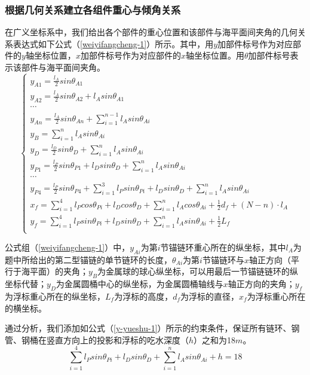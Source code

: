 \documentclass[withoutpreface,bwprint]{cumcmthesis} %
\begin{document}
\subsubsection*{根据几何关系建立各组件重心与倾角关系}
\par 在广义坐标系中，我们给出各个部件的重心位置和该部件与海平面间夹角的几何关系表达式如下公式（\ref{weiyifangcheng-1}）所示。其中，用$y$加部件标号作为对应部件的$y$轴坐标位置，$x$加部件标号作为对应部件的$x$轴坐标位置。用$\theta$加部件标号表示该部件与海平面间夹角。
\begin{equation}
	\label{weiyifangcheng-1}
	\left\{
	\begin{array}{lr}
		y_{A1} = \frac{l_A}{2} sin \theta_{A1}\\
		y_{A2} = \frac{l_A}{2} sin \theta_{A2} + l_A sin \theta_{A1}\\
		\cdots \\
		y_{An} = \frac{l_A}{2} sin \theta_{An} + \sum\limits_{i=1}^{n-1} l_A sin \theta_{Ai}\\
		y_B = \sum\limits_{i=1}^{n} l_A sin \theta_{Ai}\\
		y_D = \frac{l_D}{2} sin \theta_D + \sum\limits_{i=1}^{n} l_A sin \theta_{Ai}\\
		y_{P1} = \frac{l_P}{2} sin \theta_{P1} + l_D sin \theta_D + \sum\limits_{i=1}^{n} l_A sin \theta_{Ai}\\
		\cdots \\
		y_{P4} = \frac{l_P}{2} sin \theta_{P4} + \sum\limits_{i=1}^{3} l_P sin \theta_{Pi} + l_D sin \theta_D + \sum\limits_{i=1}^{n} l_A sin \theta_{Ai}\\
		x_f = \sum\limits_{i=1}^{4} l_P cos \theta_{Pi} + l_D cos \theta_D + \sum\limits_{i=1}^{n} l_A cos \theta_{Ai} + \frac{1}{2} d_f + (N - n) \cdot l_A\\
		y_f = \sum\limits_{i=1}^{4} l_P sin \theta_{Pi} + l_D sin \theta_D + \sum\limits_{i=1}^{n} l_A sin \theta_{Ai} + \frac{1}{2} L_f\\
	\end{array}
	\right.
\end{equation}

\par 公式组（\ref{weiyifangcheng-1}）中，$y_{Ai}$为第$i$节锚链环重心所在的纵坐标，其中$l_A$为题中所给出的第二型锚链的单节链环的长度，$\theta_{Ai}$为第$i$节锚链环与$x$轴正方向（平行于海平面）的夹角；$y_B$为金属球的球心纵坐标，可以用最后一节锚链链环的纵坐标代替；$y_D$为金属圆桶中心的纵坐标，为金属圆桶轴线与$x$轴正方向的夹角；$y_f$为浮标重心所在的纵坐标，$L_f$为浮标的高度，$d_f$为浮标的直径，$x_f$为浮标重心所在的横坐标。
\par 通过分析，我们添加如公式（\ref{y-yueshu-1}）所示的约束条件，保证所有链环、钢管、钢桶在竖直方向上的投影和浮标的吃水深度（$h$）之和为18$m$。
\begin{equation}
	\label{y-yueshu-1}
	\sum\limits_{i=1}^{4} l_P sin \theta_{Pi} + l_D sin \theta_D + \sum\limits_{i=1}^{n} l_A sin \theta_{Ai} + h = 18
\end{equation}
\end{document}
